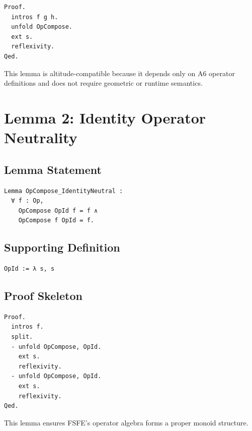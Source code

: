 \documentclass[11pt]{article}
\begin{document}
\begin{verbatim}
Proof.
  intros f g h.
  unfold OpCompose.
  ext s.
  reflexivity.
Qed.
\end{verbatim}

This lemma is altitude-compatible because it depends only on A6 operator
definitions and does not require geometric or runtime semantics.

\newpage


\section{Lemma 2: Identity Operator Neutrality}

\subsection{Lemma Statement}

\begin{verbatim}
Lemma OpCompose_IdentityNeutral :
  ∀ f : Op,
    OpCompose OpId f = f ∧
    OpCompose f OpId = f.
\end{verbatim}

\subsection{Supporting Definition}

\begin{verbatim}
OpId := λ s, s
\end{verbatim}

\subsection{Proof Skeleton}

\begin{verbatim}
Proof.
  intros f.
  split.
  - unfold OpCompose, OpId.
    ext s.
    reflexivity.
  - unfold OpCompose, OpId.
    ext s.
    reflexivity.
Qed.
\end{verbatim}

This lemma ensures FSFE’s operator algebra forms a proper monoid structure.

\newpage

\end{document}
